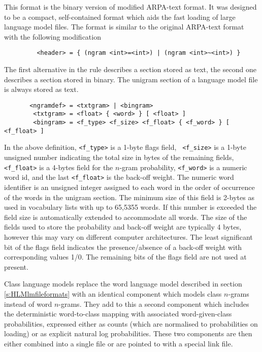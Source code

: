 This format is the binary version of modified ARPA-text format. It was
designed to be a compact, self-contained format which aids the fast
loading of large language model files. The format is similar to the
original ARPA-text format with the following modification
\begin{verbatim}
         <header> = { (ngram <int>=<int>) | (ngram <int>~<int>) } 
\end{verbatim}
The first alternative in the rule describes a section stored as text,
the second one describes a section stored in binary. The unigram
section of a language model file is always stored as text.
\begin{verbatim}
       <ngramdef> = <txtgram> | <bingram>
        <txtgram> = <float> { <word> } [ <float> ]
        <bingram> = <f_type> <f_size> <f_float> { <f_word> } [ <f_float> ]
\end{verbatim}
In the above definition, {\tt <f\_type>} is a 1-byte flags field, {\tt
<f\_size>} is a 1-byte unsigned number indicating the total size in
bytes of the remaining fields, {\tt <f\_float>} is a 4-bytes field for
the $n$-gram probability, {\tt <f\_word>} is a numeric word id, and
the last {\tt <f\_float>} is the back-off weight. The numeric word
identifier is an unsigned integer assigned to each word in the order
of occurrence of the words in the unigram section. The minimum size of
this field is 2-bytes as used in vocabulary lists with up to 65,5355
words. If this number is exceeded the field size is automatically
extended to accommodate all words.  The size of the fields used to
store the probability and back-off weight are typically 4 bytes,
however this may vary on different computer architectures.  The least
significant bit of the flags field indicates the presence/absence of a
back-off weight with corresponding values 1/0. The remaining bits of
the flags field are not used at present.



Class language models replace the word language model described in
section \ref{s:HLMlmfileformats} with an identical component which
models class $n$-grams instead of word $n$-grams.  They add to this a
second component which includes the deterministic word-to-class
mapping with associated word-given-class probabilities, expressed
either as counts (which are normalised to probabilities on loading) or
as explicit natural log probabilities.  These two components are then
either combined into a single file or are pointed to with a special
link file.


